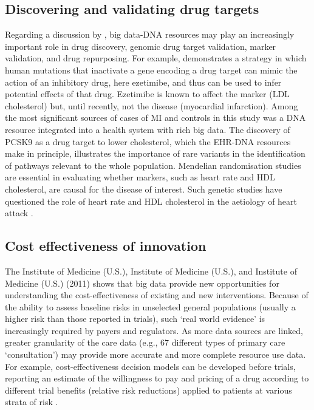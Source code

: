 \documentclass[sigconf]{acmart}
\begin{document}
\subsection{Discovering and validating drug targets}
Regarding a discussion by \cite{rajkumar2010diagnosis}, big data-DNA resources may play an increasingly important role in drug discovery, genomic drug target validation, marker validation, and drug repurposing.
For example, \cite{rajkumar2010diagnosis} demonstrates a strategy in which human mutations that inactivate a gene encoding a drug target can mimic the action of an inhibitory drug, here ezetimibe, and thus can be used to infer potential effects of that drug.
 Ezetimibe is known to affect the marker (LDL cholesterol) but, until recently, not the disease (myocardial infarction).
Among the most significant sources of cases of MI and controls in this study was a DNA resource integrated into a health system with rich big data.  The discovery of PCSK9 as a drug target to lower cholesterol, which the EHR-DNA resources make in principle, illustrates the importance of rare variants in the identification of pathways relevant to the whole population.
Mendelian randomisation studies are essential in evaluating whether markers, such as heart rate and HDL cholesterol, are causal for the disease of interest.
Such genetic studies have questioned the role of heart rate and HDL cholesterol in the aetiology of heart attack \cite{Wijeysunderae000731}.

\subsection{Cost effectiveness of innovation}
The Institute of Medicine (U.S.), Institute of Medicine (U.S.), and Institute of Medicine (U.S.) (2011) shows that big data provide new opportunities for understanding the cost-effectiveness of existing and new interventions.
Because of the ability to assess baseline risks in unselected general populations (usually a higher risk than those reported in trials), such `real world evidence' is increasingly required by payers and regulators.
As more data sources are linked, greater granularity of the care data (e.g., 67 different types of primary care `consultation') may provide more accurate and more complete resource use data.
For example, cost-effectiveness decision models can be developed before trials, reporting an estimate of the willingness to pay and pricing of a drug according to different trial benefits (relative risk reductions) applied to patients at various strata of risk \cite{breiman2001random}.
\end{document}
